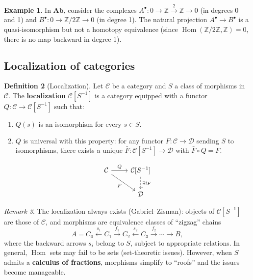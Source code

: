 \documentclass[a4paper,12pt]{book}
\DeclareMathOperator{\Hom}{Hom}
\newcommand{\Ab}{\mathbf{Ab}}
\theoremstyle{definition}
\newtheorem{definition}{Definition}[section]
\newtheorem{example}[definition]{Example}
\theoremstyle{plain}
\theoremstyle{remark}
\newtheorem{remark}[definition]{Remark}
\begin{document}
\begin{example}\label{ex:quasi-iso-not-homotopy}
In $\Ab$, consider the complexes $A^\bullet \colon 0 \to \mathbb{Z} \xrightarrow{2} \mathbb{Z} \to 0$
(in degrees 0 and 1) and $B^\bullet \colon 0 \to \mathbb{Z}/2\mathbb{Z} \to 0$ (in degree 1).
The natural projection $A^\bullet \to B^\bullet$ is a quasi-isomorphism but not a homotopy
equivalence (since $\Hom(\mathbb{Z}/2\mathbb{Z}, \mathbb{Z}) = 0$, there is no map backward
in degree 1).
\end{example}

\subsection{Localization of categories}\label{subsec:localization}

\begin{definition}[Localization]\label{def:localization-cat}
Let $\mathcal{C}$ be a category and $S$ a class of morphisms in $\mathcal{C}$.
The \textbf{localization} $\mathcal{C}[S^{-1}]$ is a category equipped with a functor
$Q \colon \mathcal{C} \to \mathcal{C}[S^{-1}]$ such that:
\begin{enumerate}
    \item $Q(s)$ is an isomorphism for every $s \in S$.
    \item $Q$ is universal with this property: for any functor $F \colon \mathcal{C} \to \mathcal{D}$
    sending $S$ to isomorphisms, there exists a unique $\bar{F} \colon \mathcal{C}[S^{-1}] \to \mathcal{D}$
    with $\bar{F} \circ Q = F$.
\end{enumerate}
\[
\begin{tikzcd}
    \mathcal{C} \arrow[r, "Q"] \arrow[rd, "F"'] & \mathcal{C}[S^{-1}] \arrow[d, dashed, "\exists!\bar{F}"] \\
    & \mathcal{D}
\end{tikzcd}
\]
\end{definition}

\begin{remark}\label{rem:localization-construction}
The localization always exists (Gabriel--Zisman): objects of $\mathcal{C}[S^{-1}]$ are those
of $\mathcal{C}$, and morphisms are equivalence classes of ``zigzag'' chains
\[
    A = C_0 \xleftarrow{s_1} C_1 \xrightarrow{f_1} C_2 \xleftarrow{s_2}
    C_3 \xrightarrow{f_2} \cdots \to B,
\]
where the backward arrows $s_i$ belong to $S$, subject to appropriate relations.
In general, $\Hom$ sets may fail to be sets (set-theoretic issues). However,
when $S$ admits a \textbf{calculus of fractions},
morphisms simplify to ``roofs'' and the issues become manageable.
\end{remark}
\end{document}
